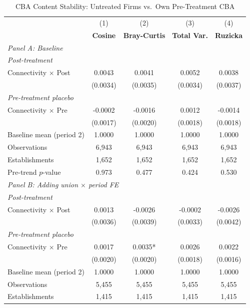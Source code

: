 \begin{table}[H]
\centering
\caption{CBA Content Stability: Untreated Firms vs.\ Own Pre-Treatment CBA}
\label{tab:self_cba_similarity}
\scriptsize
\setlength{\tabcolsep}{8pt}
\begin{tabular}{lcccc}
\hline\hline
 & (1) & (2) & (3) & (4) \\
 & \textbf{Cosine} & \textbf{Bray-Curtis} & \textbf{Total Var.} & \textbf{Ruzicka} \\
\hline
\multicolumn{5}{l}{\textit{Panel A: Baseline}} \\
\multicolumn{5}{l}{\textit{Post-treatment}} \\
Connectivity $\times$ Post & 0.0043 & 0.0041 & 0.0052 & 0.0038 \\
 & (0.0034) & (0.0035) & (0.0034) & (0.0037) \\
\multicolumn{5}{l}{\textit{Pre-treatment placebo}} \\
Connectivity $\times$ Pre & -0.0002 & -0.0016 & 0.0012 & -0.0014 \\
 & (0.0017) & (0.0020) & (0.0018) & (0.0018) \\
\hline
Baseline mean (period 2) & 1.0000 & 1.0000 & 1.0000 & 1.0000 \\
Observations &        6,943 &        6,943 &        6,943 &        6,943 \\
Establishments &        1,652 &        1,652 &        1,652 &        1,652 \\
Pre-trend $p$-value & 0.973 & 0.477 & 0.424 & 0.530 \\
\hline
\multicolumn{5}{l}{\textit{Panel B: Adding union $\times$ period FE}} \\
\multicolumn{5}{l}{\textit{Post-treatment}} \\
Connectivity $\times$ Post & 0.0013 & -0.0026 & -0.0002 & -0.0026 \\
 & (0.0036) & (0.0039) & (0.0033) & (0.0042) \\
\multicolumn{5}{l}{\textit{Pre-treatment placebo}} \\
Connectivity $\times$ Pre & 0.0017 & 0.0035* & 0.0026 & 0.0022 \\
 & (0.0020) & (0.0020) & (0.0018) & (0.0016) \\
\hline
Baseline mean (period 2) & 1.0000 & 1.0000 & 1.0000 & 1.0000 \\
Observations &        5,455 &        5,455 &        5,455 &        5,455 \\
Establishments &        1,415 &        1,415 &        1,415 &        1,415 \\

\end{tabular}
\end{table}
